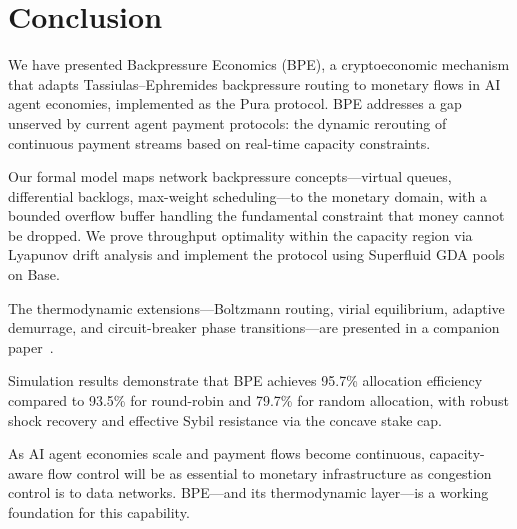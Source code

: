 \section{Conclusion}
\label{sec:conclusion}

We have presented Backpressure Economics (BPE), a cryptoeconomic mechanism that
adapts Tassiulas--Ephremides backpressure routing to monetary flows in AI agent
economies, implemented as the Pura protocol. BPE addresses a gap unserved by
current agent payment protocols: the dynamic rerouting of continuous payment
streams based on real-time capacity constraints.

Our formal model maps network backpressure concepts---virtual queues, differential
backlogs, max-weight scheduling---to the monetary domain, with a bounded overflow
buffer handling the fundamental constraint that money cannot be dropped. We prove
throughput optimality within the capacity region via Lyapunov drift analysis and
implement the protocol using Superfluid GDA pools on Base.

The thermodynamic extensions---Boltzmann routing, virial equilibrium,
adaptive demurrage, and circuit-breaker phase transitions---are presented
in a companion paper~\cite{bpethermo2025}.

Simulation results demonstrate that BPE achieves 95.7\% allocation efficiency
compared to 93.5\% for round-robin and 79.7\% for random allocation, with robust
shock recovery and effective Sybil resistance via the concave stake cap.

As AI agent economies scale and payment flows become continuous, capacity-aware
flow control will be as essential to monetary infrastructure as congestion control
is to data networks. BPE---and its thermodynamic layer---is a working foundation
for this capability.

